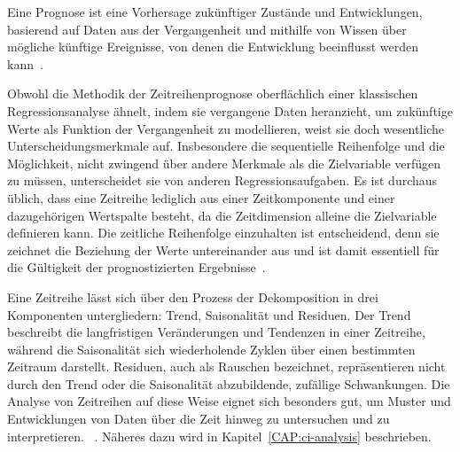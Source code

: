Eine Prognose ist eine Vorhersage zukünftiger Zustände und Entwicklungen, basierend auf Daten aus der Vergangenheit und mithilfe von Wissen über mögliche künftige Ereignisse, von denen die Entwicklung beeinflusst werden kann~\cite{Peixeiro.2022}.

Obwohl die Methodik der Zeitreihenprognose oberflächlich einer klassischen Regressionsanalyse ähnelt, indem sie vergangene Daten heranzieht, um zukünftige Werte als Funktion der Vergangenheit zu modellieren, weist sie doch wesentliche Unterscheidungsmerkmale auf.
Insbesondere die sequentielle Reihenfolge und die Möglichkeit, nicht zwingend über andere Merkmale als die Zielvariable verfügen zu müssen, unterscheidet sie von anderen Regressionsaufgaben.
Es ist durchaus üblich, dass eine Zeitreihe lediglich aus einer Zeitkomponente und einer dazugehörigen Wertspalte besteht, da die Zeitdimension alleine die Zielvariable definieren kann.
Die zeitliche Reihenfolge einzuhalten ist entscheidend, denn sie zeichnet die Beziehung der Werte untereinander aus und ist damit essentiell für die Gültigkeit der prognostizierten Ergebnisse~\cite{Peixeiro.2022}.

Eine Zeitreihe lässt sich über den Prozess der Dekomposition in drei Komponenten untergliedern:
Trend, Saisonalität und Residuen.
Der Trend beschreibt die langfristigen Veränderungen und Tendenzen in einer Zeitreihe, während die Saisonalität sich wiederholende Zyklen über einen bestimmten Zeitraum darstellt.
Residuen, auch als Rauschen bezeichnet, repräsentieren nicht durch den Trend oder die Saisonalität abzubildende, zufällige Schwankungen.
Die Analyse von Zeitreihen auf diese Weise eignet sich besonders gut, um Muster und Entwicklungen von Daten über die Zeit hinweg zu untersuchen und zu interpretieren. ~\cite{Peixeiro.2022}.
Näheres dazu wird in Kapitel~\ref{CAP:ci-analysis} beschrieben.

